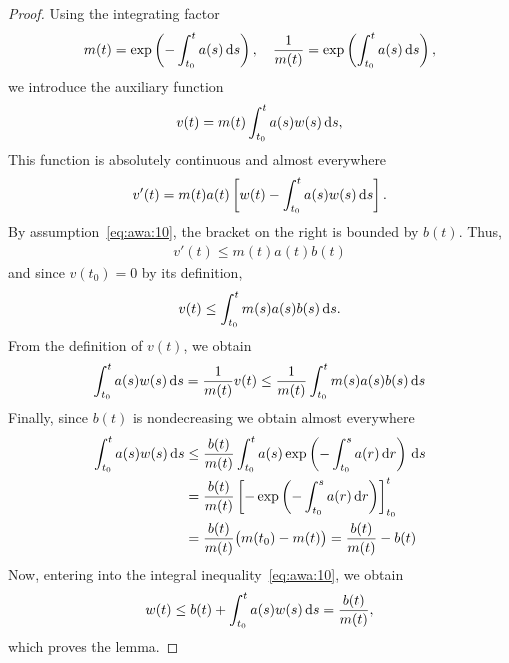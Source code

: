 
\begin{proof}
  Using the integrating factor
  \begin{gather*}
    m(t) = \exp\left(-\int_{t_0}^t a(s) \,\mathrm{d} s\right),
    \quad
    \frac1{m(t)} = \exp\left(\int_{t_0}^t a(s) \,\mathrm{d} s\right),
  \end{gather*}
  we introduce the auxiliary function
  \begin{gather*}
    v(t) = m(t) %
    \int_{t_0}^t a(s)w(s)\ds,
  \end{gather*}
  This function is absolutely continuous and almost everywhere
  \begin{gather*}
    v'(t) = m(t) a(t) %
    \left[
      w(t) - \int_{t_0}^t a(s) w(s) \ds
    \right].
  \end{gather*}
  By assumption~\eqref{eq:awa:10}, the bracket on the right is bounded
  by $b(t)$. Thus,
  \begin{gather*}
    v'(t) \le m(t) a(t) b(t) %
  \end{gather*}
  and since $v(t_0) = 0$ by its definition,
  \begin{gather*}
    v(t) \le \int_{t_0}^t m(s) a(s) b(s) %
    \ds.
  \end{gather*}
  From the definition of $v(t)$, we obtain
  \begin{gather*}
    \int_{t_0}^t a(s)w(s)\ds = \frac1{m(t)} %
    v(t)
    \le \frac1{m(t)} \int_{t_0}^t m(s)a(s)b(s) \ds
  \end{gather*}
  Finally, since $b(t)$ is nondecreasing we obtain almost everywhere
  \begin{align*}
    \int_{t_0}^t a(s)w(s)\,\mathrm{d} s
    &\le  \frac{b(t)}{m(t)} \int_{t_0}^t a(s)
    \exp\left(-\int_{t_0}^s a(r) \,\mathrm{d} r\right)\,\mathrm{d} s
    \\
    &= \frac{b(t)}{m(t)} \left[-
    \exp\left(-\int_{t_0}^s a(r) \,\mathrm{d} r\right)
      \right]_{t_0}^t
    \\
    &= \frac{b(t)}{m(t)} \bigl(m(t_0)-m(t)\bigr)
      = \frac{b(t)}{m(t)} - b(t)
  \end{align*}
  Now, entering into the integral inequality~\eqref{eq:awa:10}, we
  obtain
  \begin{gather*}
    w(t) \le b(t) + \int_{t_0}^t a(s)w(s)\,\mathrm{d} s = \frac{b(t)}{m(t)},
  \end{gather*}
  which proves the lemma.
\end{proof}

